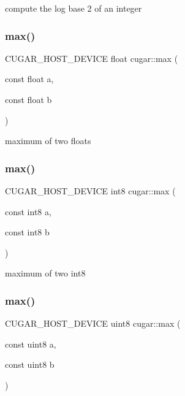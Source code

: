 compute the log base 2 of an integer \mbox{\label{group___basic_gacf2a4854f407fd49acbe6de7dd955fb1}} 
\subsubsection{\texorpdfstring{max()}{max()}\hspace{0.1cm}{\footnotesize\ttfamily [1/8]}}
{\footnotesize\ttfamily C\+U\+G\+A\+R\+\_\+\+H\+O\+S\+T\+\_\+\+D\+E\+V\+I\+CE float cugar\+::max (\begin{DoxyParamCaption}\item[{const float}]{a,  }\item[{const float}]{b }\end{DoxyParamCaption})\hspace{0.3cm}{\ttfamily [inline]}}

maximum of two floats \mbox{\label{group___basic_ga4064b22dd9157ceb1c2bcdbfdad13fbd}} 
\subsubsection{\texorpdfstring{max()}{max()}\hspace{0.1cm}{\footnotesize\ttfamily [2/8]}}
{\footnotesize\ttfamily C\+U\+G\+A\+R\+\_\+\+H\+O\+S\+T\+\_\+\+D\+E\+V\+I\+CE int8 cugar\+::max (\begin{DoxyParamCaption}\item[{const int8}]{a,  }\item[{const int8}]{b }\end{DoxyParamCaption})\hspace{0.3cm}{\ttfamily [inline]}}

maximum of two int8 \mbox{\label{group___basic_gafe1b5e565ab031c6a2fe4430777e0d64}} 
\subsubsection{\texorpdfstring{max()}{max()}\hspace{0.1cm}{\footnotesize\ttfamily [3/8]}}
{\footnotesize\ttfamily C\+U\+G\+A\+R\+\_\+\+H\+O\+S\+T\+\_\+\+D\+E\+V\+I\+CE uint8 cugar\+::max (\begin{DoxyParamCaption}\item[{const uint8}]{a,  }\item[{const uint8}]{b }\end{DoxyParamCaption})\hspace{0.3cm}{\ttfamily [inline]}}

